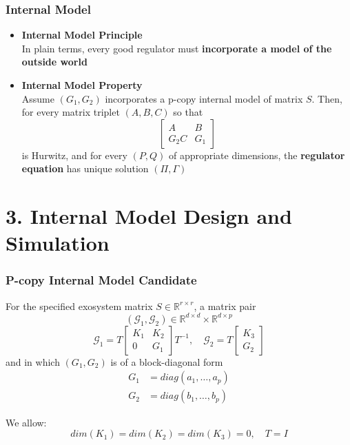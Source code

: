 \documentclass{beamer}
\begin{document}
\begin{frame}[fragile]
	\frametitle{{\color{red} Internal Model}}
\begin{itemize}
  \item \textbf{\color{blue}Internal Model Principle}\\
  In plain terms, every good regulator must \textbf{incorporate a model of the outside world}

  \item \textbf{\color{blue}Internal Model Property}\\
  Assume $(G_{1}, G_{2})$ incorporates a p-copy internal model of matrix $S$. Then, for every matrix triplet $(A, B, C)$ so that
  $$\left[\begin{matrix}
      A & B \\
      G_{2}C & G_{1}
    \end{matrix}\right]$$
  is Hurwitz, and for every $(P, Q)$ of appropriate dimensions, the \textbf{regulator equation} has unique solution $(\Pi, \Gamma)$
\end{itemize}
\end{frame}


\section{\large 3. Internal Model Design and Simulation}

\begin{frame}[fragile]
	\frametitle{{\color{red} P-copy Internal Model Candidate}}
For the specified exosystem matrix $S \in \mathbb{R}^{r\times r}$, a matrix pair
    $$
    \left(\mathcal{G}_{1}, \mathcal{G}_{2}\right) \in \mathbb{R}^{d \times d} \times \mathbb{R}^{d \times p}
    $$
    $$
    \mathcal{G}_{1}=T\left[\begin{array}{cc}
    {K_{1}} & {K_{2}} \\
    {0} & {G_{1}}
    \end{array}\right] T^{-1}, \quad \mathcal{G}_{2}=T\left[\begin{array}{c}
    {K_{3}} \\
    {G_{2}}
    \end{array}\right]
    $$
and in which $(G_{1},G_{2})$ is of a block-diagonal form
\begin{equation}\label{g1g2}\nonumber
  \begin{aligned}
    G_{1} &= diag(a_{1},\dots,a_{p}) \\
    G_{2} &= diag(b_{1},\dots,b_{p})
  \end{aligned}
\end{equation}

We allow:
$$dim(K_{1})=dim(K_{2})=dim(K_{3}) = 0 ,\quad T = I$$
\end{frame}
\end{document}
